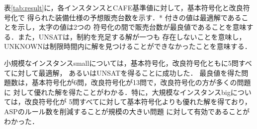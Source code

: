 表\ref{tab:result}に，各インスタンスとCAFE基準値に対して，基本符号化と改良符号化で
得られた装備仕様の予想販売台数を示す．* 付きの値は最適解であることを示し，太字の値は2つの
符号化の間で販売台数が最良値であることを意味する．また，UNSATは，制約を充足する解が一つも
存在しないことを意味し，UNKNOWNは制限時間内に解を見つけることができなかったことを意味する．


小規模なインスタンスsmallについては，基本符号化，改良符号化ともに5問すべてに対して最適解，
あるいはUNSATを得ることに成功した．
最良値を得た問題数は，基本符号化が6問，改良符号化が13問で，改良符号化の方が多くの問題に
対して優れた解を得たことがわかる．特に，大規模なインスタンスbigについては，改良符号化が
5問すべてに対して基本符号化よりも優れた解を得ており，ASPのルール数を削減することが規模の大きい問題
に対して有効であることがわかった．